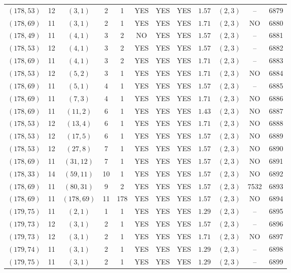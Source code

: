 \begin{longtable}{|c|c|c|c|c|c|c|c|c|c|c|c|}
$(178,53)$ & 12 & $(3,1)$ & 2 & 1 & YES & YES & YES & $1.57$ & $(2,3)$ & -- & 6879\\
$(178,69)$ & 11 & $(3,1)$ & 2 & 1 & YES & YES & YES & $1.71$ & $(2,3)$ & NO & 6880\\
$(178,49)$ & 11 & $(4,1)$ & 3 & 2 & NO & YES & YES & $1.57$ & $(2,3)$ & -- & 6881\\
$(178,53)$ & 12 & $(4,1)$ & 3 & 2 & YES & YES & YES & $1.57$ & $(2,3)$ & -- & 6882\\
$(178,69)$ & 11 & $(4,1)$ & 3 & 2 & YES & YES & YES & $1.71$ & $(2,3)$ & -- & 6883\\
$(178,53)$ & 12 & $(5,2)$ & 3 & 1 & YES & YES & YES & $1.71$ & $(2,3)$ & NO & 6884\\
$(178,69)$ & 11 & $(5,1)$ & 4 & 1 & YES & YES & YES & $1.57$ & $(2,3)$ & -- & 6885\\
$(178,69)$ & 11 & $(7,3)$ & 4 & 1 & YES & YES & YES & $1.71$ & $(2,3)$ & NO & 6886\\
$(178,69)$ & 11 & $(11,2)$ & 6 & 1 & YES & YES & YES & $1.43$ & $(2,3)$ & NO & 6887\\
$(178,53)$ & 12 & $(13,4)$ & 6 & 1 & YES & YES & YES & $1.71$ & $(2,3)$ & NO & 6888\\
$(178,53)$ & 12 & $(17,5)$ & 6 & 1 & YES & YES & YES & $1.57$ & $(2,3)$ & NO & 6889\\
$(178,53)$ & 12 & $(27,8)$ & 7 & 1 & YES & YES & YES & $1.57$ & $(2,3)$ & NO & 6890\\
$(178,69)$ & 11 & $(31,12)$ & 7 & 1 & YES & YES & YES & $1.57$ & $(2,3)$ & NO & 6891\\
$(178,33)$ & 14 & $(59,11)$ & 10 & 1 & YES & YES & YES & $1.57$ & $(2,3)$ & NO & 6892\\
$(178,69)$ & 11 & $(80,31)$ & 9 & 2 & YES & YES & YES & $1.57$ & $(2,3)$ & 7532 & 6893\\
$(178,69)$ & 11 & $(178,69)$ & 11 & 178 & YES & YES & YES & $1.57$ & $(2,3)$ & NO & 6894\\
$(179,75)$ & 11 & $(2,1)$ & 1 & 1 & YES & YES & YES & $1.29$ & $(2,3)$ & -- & 6895\\
$(179,73)$ & 12 & $(3,1)$ & 2 & 1 & YES & YES & YES & $1.57$ & $(2,3)$ & -- & 6896\\
$(179,73)$ & 12 & $(3,1)$ & 2 & 1 & YES & YES & YES & $1.71$ & $(2,3)$ & NO & 6897\\
$(179,74)$ & 11 & $(3,1)$ & 2 & 1 & YES & YES & YES & $1.29$ & $(2,3)$ & -- & 6898\\
$(179,75)$ & 11 & $(3,1)$ & 2 & 1 & YES & YES & YES & $1.29$ & $(2,3)$ & -- & 6899\\

\end{longtable}

